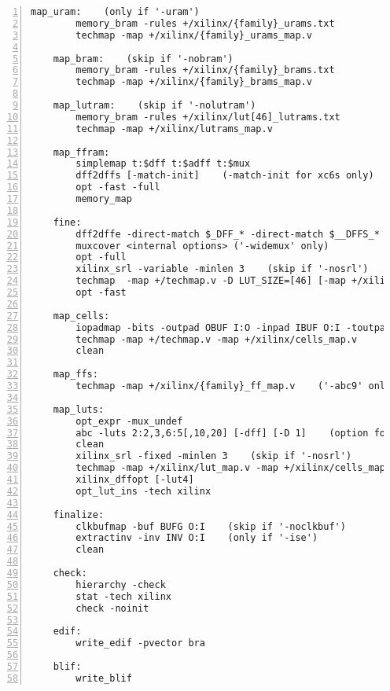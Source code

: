 \begin{lstlisting}[numbers=left,frame=single]
    map_uram:    (only if '-uram')
        memory_bram -rules +/xilinx/{family}_urams.txt
        techmap -map +/xilinx/{family}_urams_map.v

    map_bram:    (skip if '-nobram')
        memory_bram -rules +/xilinx/{family}_brams.txt
        techmap -map +/xilinx/{family}_brams_map.v

    map_lutram:    (skip if '-nolutram')
        memory_bram -rules +/xilinx/lut[46]_lutrams.txt
        techmap -map +/xilinx/lutrams_map.v

    map_ffram:
        simplemap t:$dff t:$adff t:$mux
        dff2dffs [-match-init]    (-match-init for xc6s only)
        opt -fast -full
        memory_map

    fine:
        dff2dffe -direct-match $_DFF_* -direct-match $__DFFS_*
        muxcover <internal options> ('-widemux' only)
        opt -full
        xilinx_srl -variable -minlen 3    (skip if '-nosrl')
        techmap  -map +/techmap.v -D LUT_SIZE=[46] [-map +/xilinx/mux_map.v] -map +/xilinx/arith_map.v
        opt -fast

    map_cells:
        iopadmap -bits -outpad OBUF I:O -inpad IBUF O:I -toutpad $__XILINX_TOUTPAD OE:I:O -tinoutpad $__XILINX_TINOUTPAD OE:O:I:IO A:top    (skip if '-noiopad')
        techmap -map +/techmap.v -map +/xilinx/cells_map.v
        clean

    map_ffs:
        techmap -map +/xilinx/{family}_ff_map.v    ('-abc9' only)

    map_luts:
        opt_expr -mux_undef
        abc -luts 2:2,3,6:5[,10,20] [-dff] [-D 1]    (option for 'nowidelut', '-dff', '-retime')
        clean
        xilinx_srl -fixed -minlen 3    (skip if '-nosrl')
        techmap -map +/xilinx/lut_map.v -map +/xilinx/cells_map.v -map +/xilinx/{family}_ff_map.v -D LUT_WIDTH=[46]
        xilinx_dffopt [-lut4]
        opt_lut_ins -tech xilinx

    finalize:
        clkbufmap -buf BUFG O:I    (skip if '-noclkbuf')
        extractinv -inv INV O:I    (only if '-ise')
        clean

    check:
        hierarchy -check
        stat -tech xilinx
        check -noinit

    edif:
        write_edif -pvector bra 

    blif:
        write_blif 
\end{lstlisting}

